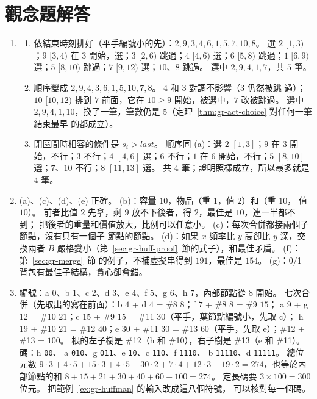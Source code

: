 \section*{觀念題解答}

\begin{enumerate}
\item
\begin{enumerate}
\item 依結束時刻排好（平手編號小的先）：$2, 9, 3, 4, 6, 1, 5, 7, 10, 8$。 選 $2$
$[1, 3)$；$9$ $[3, 4)$ 在 $3$ 開始，選；$3$ $[2, 6)$ 跳過；$4$ $[4, 6)$ 選；$6$
$[5, 8)$ 跳過；$1$ $[6, 9)$ 選；$5$ $[8, 10)$ 跳過；$7$ $[9, 12)$ 選；$10$、$8$ 跳過。
選中 $2, 9, 4, 1, 7$，共 $5$ 筆。
\item 順序變成 $2, 9, 4, 3, 6, 1, 5, 10, 7, 8$。 $4$ 和 $3$ 對調不影響（$3$ 仍然被跳
過）；$10$ $[10, 12)$ 排到 $7$ 前面，它在 $10 \ge 9$ 開始，被選中，$7$ 改被跳過。 選中
$2, 9, 4, 1, 10$，換了一筆，筆數仍是 $5$（定理~\ref{thm:gr-act-choice} 對任何一筆結束最早
的都成立）。
\item 閉區間時相容的條件是 $s_i > \mathit{last}$。 順序同 (a)：選 $2$ $[1, 3]$；$9$
在 $3$ 開始，不行；$3$ 不行；$4$ $[4, 6]$ 選；$6$ 不行；$1$ 在 $6$ 開始，不行；$5$
$[8, 10]$ 選；$7$、$10$ 不行；$8$ $[11, 13]$ 選。 共 $4$ 筆；證明照樣成立，所以最多就是 $4$ 筆。
\end{enumerate}

\item (a)、(c)、(d)、(e) 正確。 (b)：容量 $10$，物品（重 $1$，值 $2$）和（重 $10$，
值 $10$）。 前者比值 $2$ 先拿，剩 $9$ 放不下後者，得 $2$，最佳是 $10$，連一半都不到；
把後者的重量和價值放大，比例可以任意小。 (c)：每次合併都接兩個子節點，沒有只有一個子
節點的節點。 (d)：如果 $x$ 頻率比 $y$ 高卻比 $y$ 深，交換兩者 $B$ 嚴格變小（第~\ref{sec:gr-huff-proof}~節的式子），和最佳矛盾。 (f)：第~\ref{sec:gr-merge}~節
的例子，不補虛擬串得到 $191$，最佳是 $154$。 (g)：0/1 背包有最佳子結構，貪心卻會錯。

\item 編號：a $0$、b $1$、c $2$、d $3$、e $4$、f $5$、g $6$、h $7$，內部節點從 $8$
開始。 七次合併（先取出的寫在前面）：b $4$ + d $4$ = \#8 $8$；f $7$ + \#8 $8$ = \#9 $15$；
a $9$ + g $12$ = \#10 $21$；c $15$ + \#9 $15$ = \#11 $30$（平手，葉節點編號小，先取 c）；
h $19$ + \#10 $21$ = \#12 $40$；e $30$ + \#11 $30$ = \#13 $60$（平手，先取 e）；\#12 + \#13 = $100$。
根的左子樹是 \#12（h 和 \#10），右子樹是 \#13（e 和 \#11）。 碼：h \texttt{00}、
a \texttt{010}、g \texttt{011}、e \texttt{10}、c \texttt{110}、f \texttt{1110}、
b \texttt{11110}、d \texttt{11111}。 總位元數
$9 \cdot 3 + 4 \cdot 5 + 15 \cdot 3 + 4 \cdot 5 + 30 \cdot 2 + 7 \cdot 4 + 12 \cdot 3
+ 19 \cdot 2 = 274$，也等於內部節點的和 $8 + 15 + 21 + 30 + 40 + 60 + 100 = 274$。
定長碼要 $3 \times 100 = 300$ 位元。 把範例~\ref{ex:gr-huffman} 的輸入改成這八個符號，
可以核對每一個碼。


\end{enumerate}
